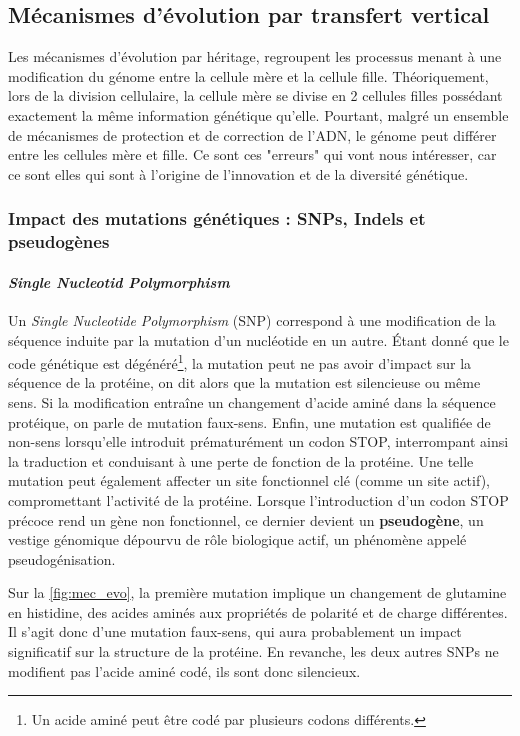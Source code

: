 \subsection{Mécanismes d'évolution par transfert vertical}
\label{sec:evo_ver}
Les mécanismes d'évolution par héritage, regroupent les processus menant à une modification du génome entre la cellule mère et la cellule fille. Théoriquement, lors de la division cellulaire, la cellule mère se divise en 2 cellules filles possédant exactement la même information génétique qu'elle. Pourtant, malgré un ensemble de mécanismes de protection et de correction de l'ADN, le génome peut différer entre les cellules mère et fille. Ce sont ces "erreurs" qui vont nous intéresser, car ce sont elles qui sont à l'origine de l'innovation et de la diversité génétique.

\newpage

\subsubsection{Impact des mutations génétiques : SNPs, Indels et pseudogènes}
\paragraph{\textit{Single Nucleotid Polymorphism}}

Un \textit{Single Nucleotide Polymorphism} (SNP) correspond à une modification de la séquence induite par la mutation d'un nucléotide en un autre.
Étant donné que le code génétique est dégénéré\footnote{Un acide aminé peut être codé par plusieurs codons différents.}, la mutation peut ne pas avoir d'impact sur la séquence de la protéine, on dit alors que la mutation est silencieuse ou même sens. Si la modification entraîne un changement d’acide aminé dans la séquence protéique, on parle de mutation faux-sens. Enfin, une mutation est qualifiée de non-sens lorsqu'elle introduit prématurément un codon STOP, interrompant ainsi la traduction et conduisant à une perte de fonction de la protéine. Une telle mutation peut également affecter un site fonctionnel clé (comme un site actif), compromettant l’activité de la protéine. Lorsque l’introduction d’un codon STOP précoce rend un gène non fonctionnel, ce dernier devient un \textbf{pseudogène}, un vestige génomique dépourvu de rôle biologique actif, un phénomène appelé pseudogénisation.

Sur la \autoref{fig:mec_evo}, la première mutation implique un changement de glutamine en histidine, des acides aminés aux propriétés de polarité et de charge différentes. Il s’agit donc d’une mutation faux-sens, qui aura probablement un impact significatif sur la structure de la protéine. En revanche, les deux autres SNPs ne modifient pas l’acide aminé codé, ils sont donc silencieux.

